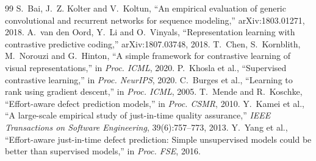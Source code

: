 \documentclass[11pt,a4paper,openany]{report}
\begin{document}
\begin{thebibliography}{99}
 S.~Bai, J.~Z. Kolter and V.~Koltun, ``An empirical evaluation of generic convolutional and
  recurrent networks for sequence modeling,'' arXiv:1803.01271, 2018.
 A.~van den Oord, Y.~Li and O.~Vinyals, ``Representation learning with contrastive predictive
  coding,'' arXiv:1807.03748, 2018.
 T.~Chen, S.~Kornblith, M.~Norouzi and G.~Hinton, ``A simple framework for contrastive learning of
  visual representations,'' in \emph{Proc. ICML}, 2020.
 P.~Khosla et al., ``Supervised contrastive learning,'' in \emph{Proc. NeurIPS}, 2020.
 C.~Burges et al., ``Learning to rank using gradient descent,'' in \emph{Proc. ICML}, 2005.
 T.~Mende and R.~Koschke, ``Effort-aware defect prediction models,'' in \emph{Proc. CSMR}, 2010.
 Y.~Kamei et al., ``A large-scale empirical study of just-in-time quality assurance,''
  \emph{IEEE Transactions on Software Engineering}, 39(6):757--773, 2013.
 Y.~Yang et al., ``Effort-aware just-in-time defect prediction: Simple unsupervised models could be
  better than supervised models,'' in \emph{Proc. FSE}, 2016.
\end{thebibliography}
\end{document}
